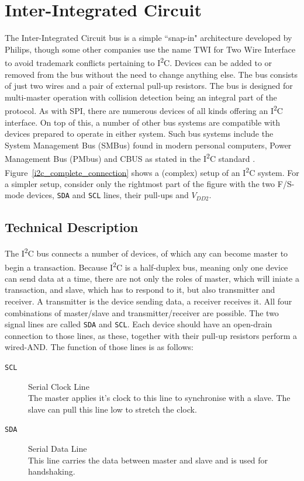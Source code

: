 \documentclass[journal]{IEEEtran}
\newcommand{\twi}{I\textsuperscript{2}C\xspace}
\newcommand{\sda}{\texttt{SDA}\xspace}
\newcommand{\scl}{\texttt{SCL}\xspace}
\begin{document}
\section{Inter-Integrated Circuit}
The Inter-Integrated Circuit bus  is a simple ``snap-in" architecture developed by Philips, though some other companies use the name TWI for Two Wire Interface to avoid trademark conflicts pertaining to \twi \cite{twi1}\cite{twi2}. Devices can be added to or removed from the bus without the need to change anything else. The bus consists of just two wires and a pair of external pull-up resistors. The bus is designed for multi-master operation with collision detection being an integral part of the protocol. As with SPI, there are numerous devices of all kinds offering an \twi interface. On top of this, a number of other bus systems are compatible with devices prepared to operate in either system. Such bus systems include the System Management Bus (SMBus)\cite{pmbus} found in modern personal computers, Power Management Bus (PMbus)\cite{pmbus} and CBUS as stated in the \twi standard \cite{i2c_standard}. Figure~\ref{i2c_complete_connection} shows a (complex) setup of an \twi system. For a simpler setup, consider only the rightmost  part of the figure with the two F/S-mode devices, \sda and \scl lines, their pull-ups and $V_{DD2}$.

\subsection{Technical Description}
The \twi bus connects a number of devices, of which any can become master to begin a transaction. Because \twi is a half-duplex bus, meaning only one device can send data at a time, there are not only the roles of master, which will iniate a transaction, and slave, which has to respond to it, but also transmitter and receiver. A transmitter is the device sending data, a receiver receives it. All four combinations of master/slave and transmitter/receiver are possible. The two signal lines are called \sda and \scl. Each device should have an open-drain connection to those lines, as these, together with their pull-up resistors perform a wired-AND. The function of those lines is as follows:
\begin{description}
	\item[\scl] Serial Clock Line\\ The master applies it's clock to this line to synchronise with a slave. The slave can pull this line low to stretch the clock.
	\item[\sda] Serial Data Line\\ This line carries the data between master and slave and is used for handshaking.
\end{description}
\end{document}

